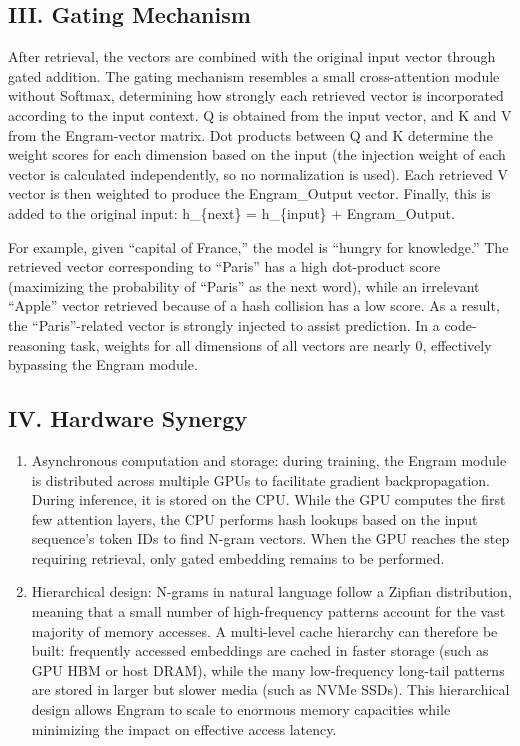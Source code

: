 \hypertarget{iii.-gating-mechanism}{%
\subsection{III. Gating Mechanism}\label{iii.-gating-mechanism}}

After retrieval, the vectors are combined with the original input vector through gated addition. The gating mechanism resembles a small cross-attention module without Softmax, determining how strongly each retrieved vector is incorporated according to the input context. Q is obtained from the input vector, and K and V from the Engram-vector matrix. Dot products between Q and K determine the weight scores for each dimension based on the input (the injection weight of each vector is calculated independently, so no normalization is used). Each retrieved V vector is then weighted to produce the Engram\_Output vector. Finally, this is added to the original input: h\_\{next\} = h\_\{input\} + Engram\_Output.

For example, given ``capital of France,'' the model is ``hungry for knowledge.'' The retrieved vector corresponding to ``Paris'' has a high dot-product score (maximizing the probability of ``Paris'' as the next word), while an irrelevant ``Apple'' vector retrieved because of a hash collision has a low score. As a result, the ``Paris''-related vector is strongly injected to assist prediction. In a code-reasoning task, weights for all dimensions of all vectors are nearly 0, effectively bypassing the Engram module.

\hypertarget{iv.-hardware-synergy}{%
\subsection{IV. Hardware Synergy}\label{iv.-hardware-synergy}}

\begin{enumerate}
\def\labelenumi{\arabic{enumi}.}
\item
  Asynchronous computation and storage: during training, the Engram module is distributed across multiple GPUs to facilitate gradient backpropagation. During inference, it is stored on the CPU. While the GPU computes the first few attention layers, the CPU performs hash lookups based on the input sequence's token IDs to find N-gram vectors. When the GPU reaches the step requiring retrieval, only gated embedding remains to be performed.
\item
  Hierarchical design: N-grams in natural language follow a Zipfian distribution, meaning that a small number of high-frequency patterns account for the vast majority of memory accesses. A multi-level cache hierarchy can therefore be built: frequently accessed embeddings are cached in faster storage (such as GPU HBM or host DRAM), while the many low-frequency long-tail patterns are stored in larger but slower media (such as NVMe SSDs). This hierarchical design allows Engram to scale to enormous memory capacities while minimizing the impact on effective access latency.
\end{enumerate}

